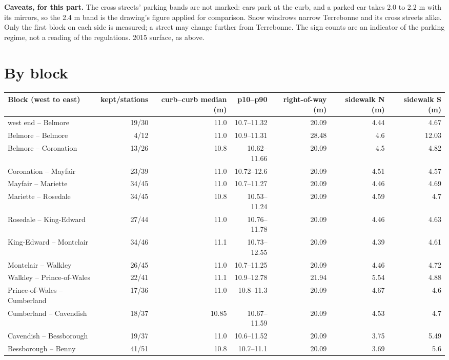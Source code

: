 \documentclass[11pt,a4paper]{article}
\begin{document}
\textbf{Caveats, for this part.} The cross streets\textquoteright{} parking bands are not marked: cars park at the curb, and a parked car takes 2.0 to 2.2 m with its mirrors, so the 2.4 m band is the drawing\textquoteright{}s figure applied for comparison. Snow windrows narrow Terrebonne and its cross streets alike. Only the first block on each side is measured; a street may change further from Terrebonne. The sign counts are an indicator of the parking regime, not a reading of the regulations. 2015 surface, as above.

\section*{By block}
{\small\begin{longtable}{@{}lrrrrrr@{}}\toprule Block (west to east) & kept/stations & curb--curb median (m) & p10--p90 & right-of-way (m) & sidewalk N (m) & sidewalk S (m)\\ \midrule
west end -- Belmore & 19/30 & 11.0 & 10.7--11.32 & 20.09 & 4.44 & 4.67 \\
Belmore -- Belmore & 4/12 & 11.0 & 10.9--11.31 & 28.48 & 4.6 & 12.03 \\
Belmore -- Coronation & 13/26 & 10.8 & 10.62--11.66 & 20.09 & 4.5 & 4.82 \\
Coronation -- Mayfair & 23/39 & 11.0 & 10.72--12.6 & 20.09 & 4.51 & 4.57 \\
Mayfair -- Mariette & 34/45 & 11.0 & 10.7--11.27 & 20.09 & 4.46 & 4.69 \\
Mariette -- Rosedale & 34/45 & 10.8 & 10.53--11.24 & 20.09 & 4.59 & 4.7 \\
Rosedale -- King-Edward & 27/44 & 11.0 & 10.76--11.78 & 20.09 & 4.46 & 4.63 \\
King-Edward -- Montclair & 34/46 & 11.1 & 10.73--12.55 & 20.09 & 4.39 & 4.61 \\
Montclair -- Walkley & 26/45 & 11.0 & 10.7--11.25 & 20.09 & 4.46 & 4.72 \\
Walkley -- Prince-of-Wales & 22/41 & 11.1 & 10.9--12.78 & 21.94 & 5.54 & 4.88 \\
Prince-of-Wales -- Cumberland & 17/36 & 11.0 & 10.8--11.3 & 20.09 & 4.67 & 4.6 \\
Cumberland -- Cavendish & 18/37 & 10.85 & 10.67--11.59 & 20.09 & 4.53 & 4.7 \\
Cavendish -- Bessborough & 19/37 & 11.0 & 10.6--11.52 & 20.09 & 3.75 & 5.49 \\
Bessborough -- Benny & 41/51 & 10.8 & 10.7--11.1 & 20.09 & 3.69 & 5.6 \\

\end{longtable}}
\end{document}
